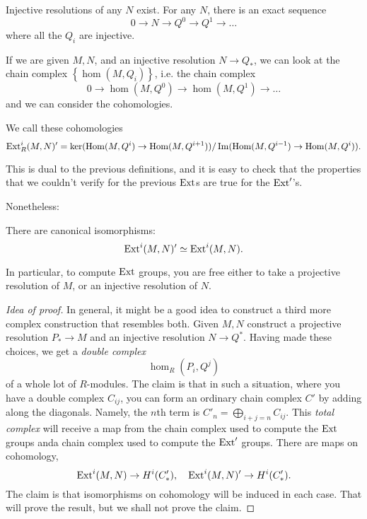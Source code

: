 \begin{corollary}
Injective resolutions of any $N$ exist. For any $N$, there is an
exact sequence
\[ 0 \to N \to Q^0 \to Q^1 \to \dots  \]
where all the $Q_i$ are injective.
\end{corollary}

If we are given $M,N$, and an injective resolution $N \to Q_*$,
we can look at
the chain complex $\left\{\hom(M,Q_i)\right\}$, i.e. the chain
complex
\[ 0 \to \hom(M, Q^0) \to \hom(M, Q^1) \to \dots  \]
and we can consider the cohomologies.

\begin{definition}
We call these cohomologies
\[ \mathrm{Ext}^i_R(M,N)' = \ker(\operatorname{Hom}(M, Q^i) \to \operatorname{Hom}(M,
Q^{i+1}))/\operatorname{Im}(\operatorname{Hom}(M,
Q^{i-1}) \to \operatorname{Hom}(M, Q^i)).  \]
\end{definition}

This is dual to the previous definitions, and it is easy to
check that the
properties that we couldn't verify for the previous $\mathrm{Ext}$s are
true for the
$\mathrm{Ext}'$'s.

Nonetheless:

\begin{theorem}
There are canonical isomorphisms:
\[ \mathrm{Ext}^i(M,N)' \simeq \mathrm{Ext}^i(M,N).  \]
\end{theorem}

In particular, to compute $\mathrm{Ext}$ groups, you are free either to
take a
projective resolution of $M$, or an injective resolution of
$N$.\begin{proof}[Idea of proof]
In general, it might be a good idea to construct a third more
complex
construction that resembles both. Given $M,N$ construct a
projective resolution
$P_* \to M$ and an injective resolution $N \to Q^*$. Having made
these choices,
we get a \emph{double complex}
\[ \hom_R(P_i, Q^j)  \]
of a whole lot of $R$-modules. The claim is that in such a
situation, where
you have a double complex $C_{ij}$, you can
form an ordinary chain complex $C'$
by adding along the diagonals. Namely, the $n$th term
is $C'_n = \bigoplus_{i+j=n} C_{ij}$. This \emph{total complex}
will receive a
map from the chain complex used to compute the $\mathrm{Ext}$ groups
anda chain
complex used to compute the $\mathrm{Ext}'$ groups. There are maps on
cohomology,
\[ \mathrm{Ext}^i(M,N) \to H^i(C'_*), \quad \mathrm{Ext}^i(M,N)' \to H^i(C'_*).
\]
The claim is that isomorphisms on
cohomology will be induced in each case. That will prove the
result, but we
shall not prove the claim.
\end{proof}

